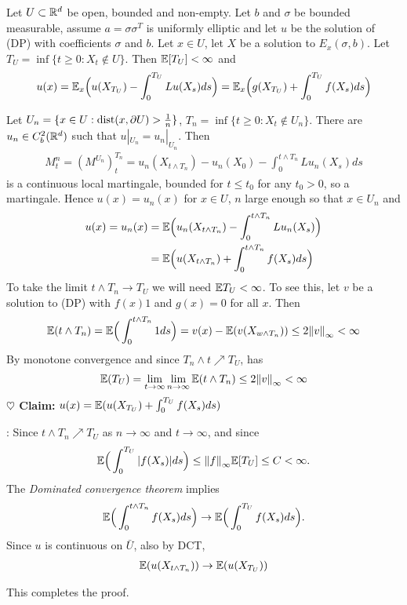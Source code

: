 \documentclass[10pt,a4paper]{article}
\newenvironment{proof}
{\begin{changemargin}{0.5cm}{0.5cm} 
	}%
	{\end{changemargin}
}
\newenvironment{subproof}
{\begin{changemargin}{0.5cm}{0.5cm} 
	}%
	{\end{changemargin}
}
\newenvironment{p}
{\begin{proof} 
	}%
	{\end{proof}
}
\begin{document}
\thm Let $U \subset \mathbb{R}^d$ be open, bounded and non-empty. Let $b$ and $\sigma$ be bounded measurable, assume $a = \sigma \sigma^T$ is uniformly elliptic and let $u$ be the solution of (DP) with coefficients $\sigma$ and $b$. Let $x\in U$, let $X$ be a solution to $E_x(\sigma, b)$. Let $T_U = \inf\{t\geq 0 : X_t \not\in U\}$. Then $\mathbb{E} [ T_U ] < \infty$ and
\begin{align*}
u(x) = \mathbb{E}_x \Big( u(X_{T_U}) - \int_{0}^{T_U} Lu(X_s) ds \Big) = \mathbb{E}_x \Big( g(X_{T_U}) + \int_0^{T_U} f(X_s) ds  \Big)
\end{align*}
\begin{p}
\pf Let $U_n = \{x\in U : \text{dist}(x, \partial U) > \frac{1}{n}\}$, $T_n = \inf \{t\geq 0 : X_t \not\in U_n \}$. There are $u_n \in C_b^2(\mathbb{R}^d)$ such that $u|_{U_n} = u_n|_{U_n}$. Then
\begin{align*}
M_t^n = (M^{U_n})_t^{T_n} = u_n(X_{t\wedge T_n}) - u_n(X_0) - \int_0^{t\wedge T_n} Lu_n(X_s) ds
\end{align*}
is a continuous local martingale, bounded for $t\leq t_0$ for any $t_0 >0$, so a martingale. Hence $u(x) = u_n (x)$ for $x\in U$, $n$ large enough so that $x\in U_n$ and
\begin{align*}
u(x) = u_n(x) & = \mathbb{E} \Big( u_n(X_{t\wedge T_n}) - \int_0^{t\wedge T_n} Lu_n(X_s) \Big) \\
&= \mathbb{E} \Big( u(X_{t\wedge T_n}) + \int_0^{t\wedge T_n} f(X_s) ds \Big)
\end{align*}
To take the limit $t\wedge T_n \rightarrow T_U$ we will need $\mathbb{E} T_U < \infty$. To see this, let $v$ be a solution to (DP) with $f(x) 1$ and $g(x) = 0$ for all $x$. Then
\begin{align*}
\avg (t\wedge T_n) = \avg \Big( \int_0^{t\wedge T_n} 1 ds \Big) = v(x) - \avg (v(X_{w\wedge T_n})) \leq 2\snorms{v}{\infty} < \infty
\end{align*}
By monotone convergence and since $T_n\wedge t \nearrow T_U$, has
\begin{align*}
\avg (T_U) = \lim_{t\rightarrow \infty} \lim_{n\rightarrow \infty} \avg(t\wedge T_n) \leq 2\snorms{v}{\infty} < \infty
\end{align*}
\textbf{$\heartsuit$ Claim:} $u(x) = \mathbb{E} (u(X_{T_U}) + \int_0^{T_U} f(X_s) ds)$
\begin{subproof}: Since $t\wedge T_n \nearrow T_U$ as $n\rightarrow \infty$ and $t\rightarrow \infty$, and since
\begin{align*}
\avg \Big( \int_0^{T_U} |f(X_s)|ds  \Big) \leq \snorms{f}{\infty} \avg [T_U] \leq C < \infty.
\end{align*}
The \emph{Dominated convergence theorem} implies
\begin{align*}
\mathbb{E} \Big( \int_0^{t\wedge T_n} f(X_s) ds \Big) \rightarrow \mathbb{E} \Big( \int_0^{T_U} f(X_s) ds\Big).
\end{align*}
Since $u$ is continuous on $\bar{U}$, also by DCT,
\begin{align*}
\mathbb{E} (u(X_{t\wedge T_n})) \rightarrow \mathbb{E} (u(X_{T_U}))
\end{align*}
\end{subproof}
This completes the proof.

\eop
\end{p}
\s
\end{document}
